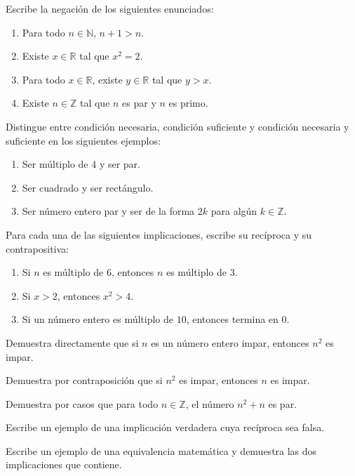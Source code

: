 \begin{ejerciciospropuestos}
  \item Escribe la negación de los siguientes enunciados:
  \begin{enumerate}
    \item Para todo $n\in\mathbb{N}$, $n+1>n$.
    \item Existe $x\in\mathbb{R}$ tal que $x^2=2$.
    \item Para todo $x\in\mathbb{R}$, existe $y\in\mathbb{R}$ tal que $y>x$.
    \item Existe $n\in\mathbb{Z}$ tal que $n$ es par y $n$ es primo.
  \end{enumerate}

  \item Distingue entre condición necesaria, condición suficiente y condición necesaria y suficiente en los siguientes ejemplos:
  \begin{enumerate}
    \item Ser múltiplo de $4$ y ser par.
    \item Ser cuadrado y ser rectángulo.
    \item Ser número entero par y ser de la forma $2k$ para algún $k\in\mathbb{Z}$.
  \end{enumerate}

  \item Para cada una de las siguientes implicaciones, escribe su recíproca y su contrapositiva:
  \begin{enumerate}
    \item Si $n$ es múltiplo de $6$, entonces $n$ es múltiplo de $3$.
    \item Si $x>2$, entonces $x^2>4$.
    \item Si un número entero es múltiplo de $10$, entonces termina en $0$.
  \end{enumerate}

  \item Demuestra directamente que si $n$ es un número entero impar, entonces $n^2$ es impar.

  \item Demuestra por contraposición que si $n^2$ es impar, entonces $n$ es impar.

  \item Demuestra por casos que para todo $n\in\mathbb{Z}$, el número $n^2+n$ es par.

  \item Escribe un ejemplo de una implicación verdadera cuya recíproca sea falsa.

  \item Escribe un ejemplo de una equivalencia matemática y demuestra las dos implicaciones que contiene.
\end{ejerciciospropuestos}

